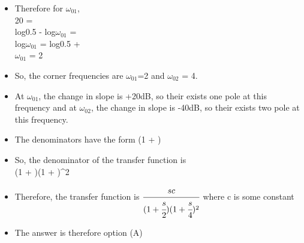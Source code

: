 \documentclass{beamer}
\begin{document}
\begin{frame}{}
    \begin{itemize}
        \item Therefore for $\omega_{01}$,\\
    20 = \\
    log0.5 - log$\omega_{01}$ = \\
    log$\omega_{01}$ = log0.5 + \\
    $\omega_{01}$ = 2
        \item So, the corner frequencies are $\omega_{01}$=2 and $\omega_{02}$ = 4.
        \item At $\omega_{01}$, the change in slope is +20dB, so their exists one pole at this frequency and at $\omega_{02}$, the change in slope is -40dB, so their exists two pole at this frequency.\\
        \item The denominators have the form (1 + )
    \end{itemize}{}
\end{frame}{}

\begin{frame}{}
    \begin{itemize}
        \item So, the denominator of the transfer function is\\ (1 + )(1 + )^2\\
        \item Therefore, the transfer function is $\cfrac{sc}{(1 + \cfrac{s}{2})(1 + \cfrac{s}{4})^2}$ where c is some constant\\
        \item The answer is therefore option (A) 
    \end{itemize}{}
\end{frame}{}
\end{document}
